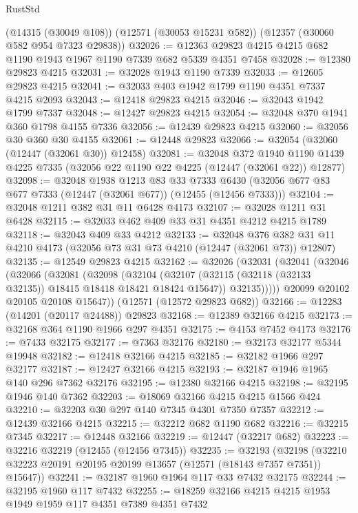 \begin{lexlean}{RustStd}
\begin{coremodule}
    (@14315 (@30049 @108))
    (@12571 (@30053 @15231 @582))
    (@12357 (@30060 @582 @954 @7323 @29838))
@32026 := @12363 @29823 @4215 @4215 @682 @1190 @1943 @1967 @1190 @7339 @682 @5339 @4351 @7458
@32028 := @12380 @29823 @4215
@32031 := @32028 @1943 @1190 @7339
@32033 := @12605 @29823 @4215
@32041 := @32033 @403 @1942 @1799 @1190 @4351 @7337 @4215 @2093
@32043 := @12418 @29823 @4215
@32046 := @32043 @1942 @1799 @7337
@32048 := @12427 @29823 @4215
@32054 := @32048 @370 @1941 @360 @1798 @4155 @7336
@32056 := @12439 @29823 @4215
@32060 := @32056 @30 @360 @30 @4155
@32061 := @12448 @29823
@32066 := @32054 (@32060 (@12447 (@32061 @30)) @12458)
@32081 := @32048
    @372
    @1940
    @1190
    @1439
    @4225
    @7335
    (@32056 @22 @1190 @22 @4225 (@12447 (@32061 @22)) @12877)
@32098 := @32048
    @1938
    @1213
    @83
    @33
    @7333
    @6430
    (@32056 @677 @83 @677 @7333 (@12447 (@32061 @677)) (@12455 (@12456 @7333)))
@32104 := @32048 @1211 @382 @31 @11 @6428 @4173
@32107 := @32028 @1211 @31 @6428
@32115 := @32033 @462 @409 @33 @31 @4351 @4212 @4215 @1789
@32118 := @32043 @409 @33 @4212
@32133 := @32048
    @376
    @382
    @31
    @11
    @4210
    @4173
    (@32056 @73 @31 @73 @4210 (@12447 (@32061 @73)) @12807)
@32135 := @12549 @29823 @4215
@32162 := @32026
    (@32031
      (@32041
        (@32046
          (@32066
            (@32081
              (@32098
                (@32104
                  (@32107 (@32115 (@32118 (@32133 @32135)) @18415 @18418 @18421 @18424 @15647))
                  @32135)))))
        @20099
        @20102
        @20105
        @20108
        @15647))
    (@12571 (@12572 @29823 @682))
@32166 := @12283 (@14201 (@20117 @24488)) @29823
@32168 := @12389 @32166 @4215
@32173 := @32168 @364 @1190 @1966 @297 @4351
@32175 := @4153 @7452 @4173
@32176 := @7433 @32175
@32177 := @7363 @32176
@32180 := @32173 @32177 @5344 @19948
@32182 := @12418 @32166 @4215
@32185 := @32182 @1966 @297 @32177
@32187 := @12427 @32166 @4215
@32193 := @32187 @1946 @1965 @140 @296 @7362 @32176
@32195 := @12380 @32166 @4215
@32198 := @32195 @1946 @140 @7362
@32203 := @18069 @32166 @4215 @4215 @1566 @424
@32210 := @32203 @30 @297 @140 @7345 @4301 @7350 @7357
@32212 := @12439 @32166 @4215
@32215 := @32212 @682 @1190 @682
@32216 := @32215 @7345
@32217 := @12448 @32166
@32219 := @12447 (@32217 @682)
@32223 := @32216 @32219 (@12455 (@12456 @7345))
@32235 := @32193
    (@32198 (@32210 @32223 @20191 @20195 @20199 @13657 (@12571 (@18143 @7357 @7351)) @15647))
@32241 := @32187 @1960 @1964 @117 @33 @7432 @32175
@32244 := @32195 @1960 @117 @7432
@32255 := @18259 @32166 @4215 @4215 @1953 @1949 @1959 @117 @4351 @7389 @4351 @7432

\end{coremodule}
\end{lexlean}
